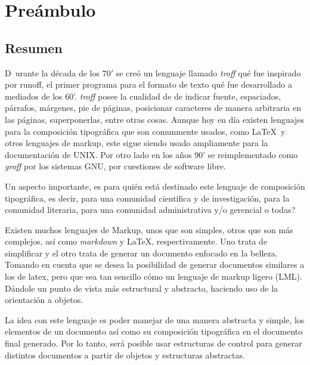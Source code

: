 \documentclass[12pt,letterpaper,titlepage,oneside,openright]{book}
\title{\initfamily}
\author{Lilue, David}
\newcommand{\nonumberchapter}[1]{
    \chapter*{#1}
    \addcontentsline{toc}{chapter}{#1}
}
\begin{document}
\frontmatter

\maketitle

\nonumberchapter{Preámbulo}

\section*{Resumen}

\lettrine[lines=2]{D}{}\ urante la década de los $70'$ se creó un lenguaje llamado \textit{troff} qué fue inspirado por
runoff, el primer programa para el formato de texto qué fue desarrollado a mediados
de los 60'. \textit{troff} posee la cualidad de de indicar fuente, espaciados,
párrafos, márgenes, pie de páginas, posicionar caracteres de manera arbitraria en las
páginas, superponerlas, entre otras cosas. Aunque hoy en día existen lenguajes para
la composición tipográfica que son comunmente usados, como \LaTeX \ y otros lenguajes de
markup, este sigue siendo usado ampliamente para la documentación de UNIX. Por otro
lado en los años 90' se reimplementado como \textit{groff} por los sistemas GNU, por
cuestiones de software libre. 

Un aspecto importante, es para quién está destinado este lenguaje de composición
tipográfica, es decir, para una comunidad científica y de investigación, para la
comunidad literaria, para una comunidad administrativa y/o gerencial o todas? 

Existen muchos lenguajes de Markup, unos que son simples, otros que son más
complejos, así como \textit{markdown} y \LaTeX, respectivamente. Uno trata de
simplificar y el otro trata de generar un documento enfocado en la belleza. Tomando
en cuenta que se desea la posibilidad de generar documentos similares a los de latex,
pero que sea tan sencillo cómo un lenguaje de markup ligero (LML). Dándole un punto
de vista más estructural y abstracto, haciendo uso de la orientación a objetos.

La idea con este lenguaje es poder manejar de una manera abstracta y simple, los
elementos de un documento así como su composición tipográfica en el documento final
generado. Por lo tanto, será posible usar estructuras de control para generar
distintos documentos a partir de objetos y estructuras abstractas.

\end{document}
